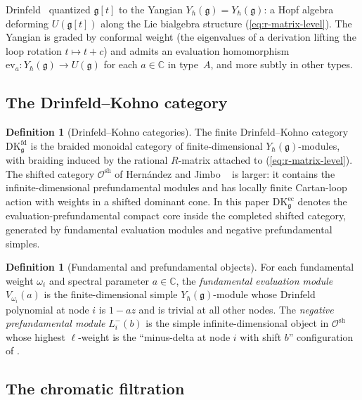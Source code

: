 \documentclass[11pt,reqno]{amsart}
\theoremstyle{definition}
\newtheorem{definition}[theorem]{Definition}
\theoremstyle{remark}
\newcommand{\cO}{\mathcal{O}}
\newcommand{\fg}{\mathfrak{g}}
\newcommand{\DK}{\mathrm{DK}}
\newcommand{\Yh}{Y_\hbar(\fg)}
\numberwithin{equation}{section}
\begin{document}
Drinfeld~\cite{Drinfeld85, Drinfeld88} quantized $\fg[t]$ to the
Yangian $\Yh = Y_\hbar(\fg)$: a Hopf algebra deforming
$U(\fg[t])$ along the Lie bialgebra structure
(\ref{eq:r-matrix-level}). The Yangian is graded by
conformal weight (the eigenvalues of a derivation lifting the
loop rotation $t \mapsto t + c$) and admits an evaluation
homomorphism $\mathrm{ev}_a: \Yh \to U(\fg)$ for each
$a \in \mathbb{C}$ in type~$A$, and more subtly in other types.

\subsection{The Drinfeld--Kohno category}

\begin{definition}[Drinfeld--Kohno categories]
\label{def:dk}
The finite Drinfeld--Kohno category $\DK^{\mathrm{fd}}_\fg$ is the
braided monoidal category of finite-dimensional $\Yh$-modules,
with braiding induced by the rational $R$-matrix attached to
(\ref{eq:r-matrix-level}). The shifted category
$\cO^{\mathrm{sh}}$ of Hern\'andez and Jimbo
~\cite{HernandezJimbo12} is larger: it contains the
infinite-dimensional prefundamental modules and has locally finite
Cartan-loop action with weights in a shifted dominant cone. In this
paper $\DK_\fg^{\mathrm{ec}}$ denotes the evaluation-prefundamental
compact core inside the completed shifted category, generated by
fundamental evaluation modules and negative prefundamental simples.
\end{definition}

\begin{definition}[Fundamental and prefundamental objects]
\label{def:prefundamental}
For each fundamental weight $\omega_i$ and spectral parameter
$a \in \mathbb{C}$, the \emph{fundamental evaluation module}
$V_{\omega_i}(a)$ is the finite-dimensional simple $\Yh$-module
whose Drinfeld polynomial at node $i$ is $1 - a z$ and is
trivial at all other nodes. The \emph{negative prefundamental
module} $L^-_i(b)$ is the simple infinite-dimensional object in
$\cO^{\mathrm{sh}}$ whose highest $\ell$-weight is the
``minus-delta at node $i$ with shift $b$'' configuration of
\cite{HernandezJimbo12}.
\end{definition}

\subsection{The chromatic filtration}
\end{document}
